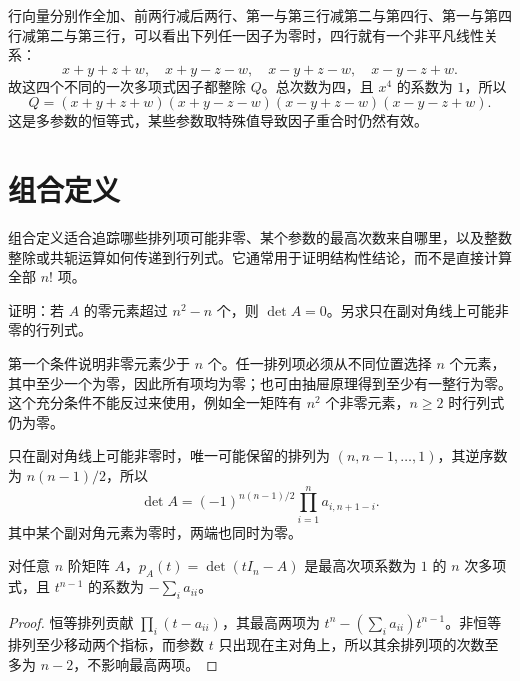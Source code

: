 \begin{solve}
行向量分别作全加、前两行减后两行、第一与第三行减第二与第四行、第一与第四行减第二与第三行，可以看出下列任一因子为零时，四行就有一个非平凡线性关系：
\[
x+y+z+w,\quad x+y-z-w,\quad x-y+z-w,\quad x-y-z+w.
\]
故这四个不同的一次多项式因子都整除 $Q$。总次数为四，且 $x^4$ 的系数为 $1$，所以
\[
Q=(x+y+z+w)(x+y-z-w)(x-y+z-w)(x-y-z+w).
\]
这是多参数的恒等式，某些参数取特殊值导致因子重合时仍然有效。
\end{solve}

\section{组合定义}
\label{sec:xie-ex-det-combinatorics}

组合定义适合追踪哪些排列项可能非零、某个参数的最高次数来自哪里，以及整数整除或共轭运算如何传递到行列式。它通常用于证明结构性结论，而不是直接计算全部 $n!$ 项。

\begin{example}
\label{ex:xie-ex-det-sparse}
证明：若 $A$ 的零元素超过 $n^2-n$ 个，则 $\det A=0$。另求只在副对角线上可能非零的行列式。
\end{example}

\begin{solve}
第一个条件说明非零元素少于 $n$ 个。任一排列项必须从不同位置选择 $n$ 个元素，其中至少一个为零，因此所有项均为零；也可由抽屉原理得到至少有一整行为零。这个充分条件不能反过来使用，例如全一矩阵有 $n^2$ 个非零元素，$n\geq2$ 时行列式仍为零。

只在副对角线上可能非零时，唯一可能保留的排列为 $(n,n-1,\ldots,1)$，其逆序数为 $n(n-1)/2$，所以
\begin{equation}
\label{eq:xie-ex-det-antidiagonal}
\det A=(-1)^{n(n-1)/2}\prod_{i=1}^{n}a_{i,n+1-i}.
\end{equation}
其中某个副对角元素为零时，两端也同时为零。
\end{solve}

\begin{proposition}
\label{prop:xie-ex-det-leading-characteristic}
对任意 $n$ 阶矩阵 $A$，$p_A(t)=\det(tI_n-A)$ 是最高次项系数为 $1$ 的 $n$ 次多项式，且 $t^{n-1}$ 的系数为 $-\sum_i a_{ii}$。
\end{proposition}

\begin{proof}
恒等排列贡献 $\prod_i(t-a_{ii})$，其最高两项为 $t^n-(\sum_i a_{ii})t^{n-1}$。非恒等排列至少移动两个指标，而参数 $t$ 只出现在主对角上，所以其余排列项的次数至多为 $n-2$，不影响最高两项。
\end{proof}

